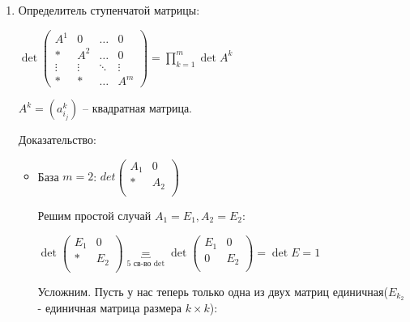 \begin{enumerate}
          Доказательство:

          \(\det (\ldots A_i + \lambda A_j\ldots A_j\ldots) = \det (\ldots A_i + \ldots A_j\ldots)  + \det (\ldots \lambda A_j\ldots A_j\ldots) = \det (\ldots A_i + \ldots A_j\ldots) + \lambda\cdot 0\) Q.E.D


    \item Определитель ступенчатой матрицы:

          \(\det
          \begin{pmatrix}
              A^1    & 0      & \ldots & 0      \\
              *      & A^2    & \ldots & 0      \\
              \vdots & \vdots & \ddots & \vdots \\
              *      & *      & \ldots & A^m
          \end{pmatrix} = \prod\limits_{k=1}^m \det A^k\)


          \(A^k = (a_{i_j}^k)\) -- квадратная матрица.

          Доказательство:
          \begin{itemize}
              \item База \(m = 2\):
                    \(det\begin{pmatrix}
                        A_1 & 0   \\
                        *   & A_2 \\
                    \end{pmatrix}\)


                    Решим простой случай \(A_1 = E_1, A_2 = E_2\):

                    \(\det\begin{pmatrix}
                        E_1 & 0   \\
                        *   & E_2 \\
                    \end{pmatrix} \underbracket{=}_{\text{5 св-во det}}
                    \det\begin{pmatrix}
                        E_1 & 0   \\
                        0   & E_2 \\
                    \end{pmatrix} = \det E = 1\)\


                    Усложним. Пусть у нас теперь только одна из двух матриц единичная(\(E_{k_2}\) - единичная матрица размера \(k \times k\)):



\end{itemize}
\end{enumerate}
